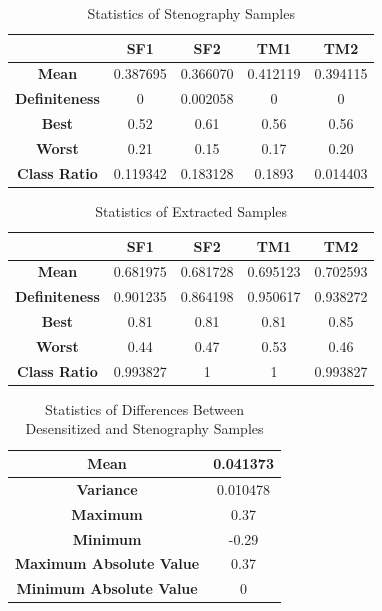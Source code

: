 \documentclass[journal]{IEEEtran} %
\begin{document}
\begin{table}[htbp]
    \centering
    \caption{Statistics of Stenography Samples}
    \begin{tabular}{|c|c|c|c|c|}
        \hline
        & \textbf{SF1} & \textbf{SF2} & \textbf{TM1} & \textbf{TM2} \\
        \hline
        \textbf{Mean} & 0.387695 & 0.366070 & 0.412119 & 0.394115 \\
        \hline
        \textbf{Definiteness} & 0 & 0.002058 & 0 & 0 \\
        \hline
        \textbf{Best} & 0.52 & 0.61 & 0.56 & 0.56 \\
        \hline
        \textbf{Worst} & 0.21 & 0.15 & 0.17 & 0.20 \\
        \hline
        \textbf{Class Ratio} & 0.119342 & 0.183128 & 0.1893 & 0.014403 \\
        \hline
    \end{tabular}
    \label{tab:st_msg}
\end{table}

\begin{table}[htbp]
    \centering
    \caption{Statistics of Extracted Samples}
    \begin{tabular}{|c|c|c|c|c|}
        \hline
        & \textbf{SF1} & \textbf{SF2} & \textbf{TM1} & \textbf{TM2} \\
        \hline
        \textbf{Mean} & 0.681975 & 0.681728 & 0.695123 & 0.702593 \\
        \hline
        \textbf{Definiteness} & 0.901235 & 0.864198 & 0.950617 & 0.938272 \\
        \hline
        \textbf{Best} & 0.81 & 0.81 & 0.81 & 0.85 \\
        \hline
        \textbf{Worst} & 0.44 & 0.47 & 0.53 & 0.46 \\
        \hline
        \textbf{Class Ratio} & 0.993827 & 1 & 1 & 0.993827 \\
        \hline
    \end{tabular}
    \label{tab:st_rec}
\end{table}

\begin{table}[htbp]
    \centering
    \caption{Statistics of Differences Between Desensitized and Stenography Samples}
    \begin{tabular}{|c|c|}
        \hline
        \textbf{Mean} & 0.041373 \\
        \hline
        \textbf{Variance} & 0.010478 \\
        \hline
        \textbf{Maximum} & 0.37 \\
        \hline
        \textbf{Minimum} & -0.29 \\
        \hline
        \textbf{Maximum Absolute Value} & 0.37 \\
        \hline
        \textbf{Minimum Absolute Value} & 0 \\
        \hline
    \end{tabular}
\end{table}
\end{document}
